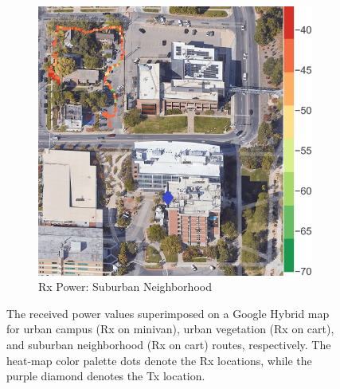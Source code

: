 \documentclass[10pt, twocolumn]{IEEEtran}
\begin{document}
\begin{figure} [t]
\begin{subfigure}{0.2579\linewidth}
         \centering
         \includegraphics[width=1.0\linewidth]{figs/rx_suburban_fraternities.jpg}
         \caption{Rx Power: Suburban Neighborhood}
         \label{F4c}
     \end{subfigure}
     \vspace{-2mm}
     \caption{The received power values superimposed on a Google Hybrid map for urban campus (Rx on minivan), urban vegetation (Rx on cart), and suburban neighborhood (Rx on cart) routes, respectively. The heat-map color palette dots denote the Rx locations, while the purple diamond denotes the Tx location.}
     \label{F4}
     \vspace{-4mm}
\end{figure}
\end{document}

